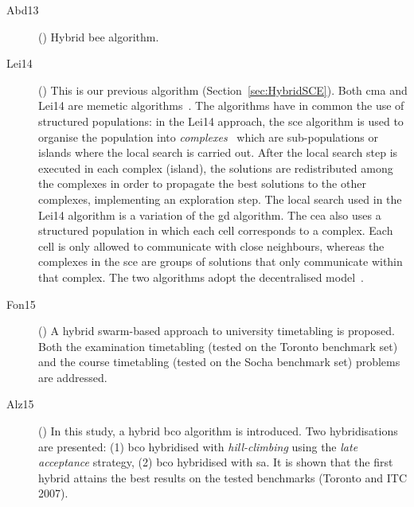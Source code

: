 \begin{description}
	\item[Abd13] (\cite{Abdullah2013}) Hybrid bee algorithm.
	
	\item[Lei14] (\cite{Leite2016}) This is our previous algorithm (Section~\ref{sec:HybridSCE}).	Both \gls{cma} and Lei14 are memetic algorithms~\citep{Neri2012}. The algorithms have in common the use of structured populations: in the Lei14 approach, the \gls{sce} algorithm is used to organise the population into \textit{complexes}~\citep{Leite2016} which are sub-populations or islands where the local search is carried out. After the local search step is executed in each complex (island), the solutions are redistributed among the complexes in order to propagate the best solutions to the other complexes, implementing an exploration step. The local search used in the Lei14 algorithm is a variation of the \gls{gd} algorithm. The \gls{cea} also uses a structured population in which each cell corresponds to a complex. Each cell is only allowed to communicate with close neighbours, whereas the complexes in the \gls{sce} are groups of solutions that only communicate within that complex. The two algorithms adopt the decentralised model~\citep{Alba2008}.
	
	\item[Fon15] (\cite{Fong2015}) A hybrid swarm-based approach to university timetabling is proposed. Both the examination timetabling (tested on the Toronto benchmark set) and the course timetabling (tested on the Socha benchmark set) problems are addressed.
	
	\item[Alz15] (\cite{Alzaqebah2015}) In this study, a hybrid \gls{bco} algorithm is introduced. Two hybridisations are presented: (1) \gls{bco} hybridised with \textit{hill-climbing} using the \textit{late acceptance} strategy, (2) \gls{bco} hybridised with \gls{sa}. It is shown that the first hybrid attains the best results on the tested benchmarks (Toronto and ITC 2007).
\end{description}





